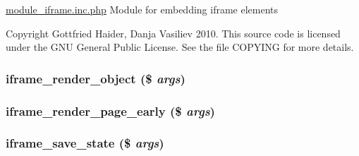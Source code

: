 \hyperlink{module__iframe_8inc_8php}{module\_\-iframe.inc.php} Module for embedding iframe elements

Copyright Gottfried Haider, Danja Vasiliev 2010. This source code is licensed under the GNU General Public License. See the file COPYING for more details. \hypertarget{module__iframe_8inc_8php_40856482f79fb837bc538e8eed66aff4}{
\subsubsection[{iframe\_\-render\_\-object}]{\setlength{\rightskip}{0pt plus 5cm}iframe\_\-render\_\-object (\$ {\em args})}}
\label{module__iframe_8inc_8php_40856482f79fb837bc538e8eed66aff4}


\hypertarget{module__iframe_8inc_8php_d4d8fd8256a19beb570193c2886659e5}{
\subsubsection[{iframe\_\-render\_\-page\_\-early}]{\setlength{\rightskip}{0pt plus 5cm}iframe\_\-render\_\-page\_\-early (\$ {\em args})}}
\label{module__iframe_8inc_8php_d4d8fd8256a19beb570193c2886659e5}


\hypertarget{module__iframe_8inc_8php_3034fcc475334b511b91932918fcfe57}{
\subsubsection[{iframe\_\-save\_\-state}]{\setlength{\rightskip}{0pt plus 5cm}iframe\_\-save\_\-state (\$ {\em args})}}
\label{module__iframe_8inc_8php_3034fcc475334b511b91932918fcfe57}


